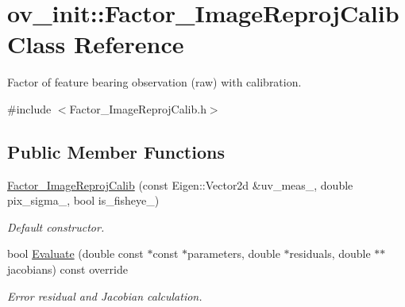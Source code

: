 \hypertarget{classov__init_1_1Factor__ImageReprojCalib}{}\section{ov\+\_\+init\+:\+:Factor\+\_\+\+Image\+Reproj\+Calib Class Reference}
\label{classov__init_1_1Factor__ImageReprojCalib}


Factor of feature bearing observation (raw) with calibration.  




{\ttfamily \#include $<$Factor\+\_\+\+Image\+Reproj\+Calib.\+h$>$}

\subsection*{Public Member Functions}
\begin{DoxyCompactItemize}
\item 
\hyperlink{classov__init_1_1Factor__ImageReprojCalib_aaecdb048ff86ec1621fc690adf6eb89a}{Factor\+\_\+\+Image\+Reproj\+Calib} (const Eigen\+::\+Vector2d \&uv\+\_\+meas\+\_\+, double pix\+\_\+sigma\+\_\+, bool is\+\_\+fisheye\+\_\+)
\begin{DoxyCompactList}\small\item\em Default constructor. \end{DoxyCompactList}\item 
bool \hyperlink{classov__init_1_1Factor__ImageReprojCalib_ad374255563922f2dff0e8d33f860419b}{Evaluate} (double const $\ast$const $\ast$parameters, double $\ast$residuals, double $\ast$$\ast$jacobians) const override
\begin{DoxyCompactList}\small\item\em Error residual and Jacobian calculation. \end{DoxyCompactList}\end{DoxyCompactItemize}
